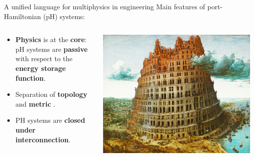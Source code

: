 \documentclass[aspectratio=169]{beamer}
\begin{document}
	
	\begin{frame}{A unified language for multiphysics in engineering}
		Main features of port-Hamiltonian (pH) systems:
		\vspace{.1cm}
		\begin{columns}
			\begin{column}{.65\textwidth}
				\begin{itemize}
					\item \textbf{Physics} is at the \textbf{core}: pH systems are \textbf{passive} with respect to the \textbf{energy storage function}.
					\item Separation of \textbf{topology} and \textbf{metric} .
					\item PH systems are \textbf{closed under interconnection}. 
				\end{itemize}
			\end{column}
			\begin{column}{.35\textwidth}
				\centering
				\includegraphics[width=.9\columnwidth]{babel_tower.jpeg}
			\end{column}
		\end{columns}
	\end{frame}
\end{document}
